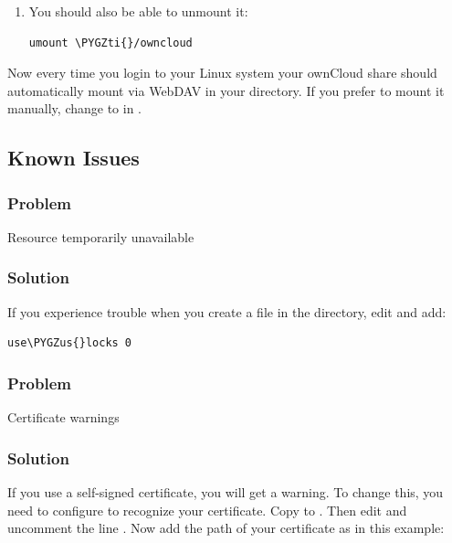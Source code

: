 \documentclass[letterpaper,10pt,english]{sphinxmanual}
\def\PYGZus{\char`\_}
\def\PYGZti{\char`\~}
\begin{document}
\begin{enumerate}
\begin{Verbatim}[commandchars=\\\{\}]
mount \PYGZti{}/owncloud
\end{Verbatim}

\item {} 
You should also be able to unmount it:

\begin{Verbatim}[commandchars=\\\{\}]
umount \PYGZti{}/owncloud
\end{Verbatim}

\end{enumerate}

Now every time you login to your Linux system your ownCloud share should
automatically mount via WebDAV in your  directory. If you prefer
to mount it manually, change  to  in .


\subsection{Known Issues}
\label{files/access_webdav:known-issues}

\subsubsection{Problem}
\label{files/access_webdav:problem}
Resource temporarily unavailable


\subsubsection{Solution}
\label{files/access_webdav:solution}
If you experience trouble when you create a file in the directory,
edit  and add:

\begin{Verbatim}[commandchars=\\\{\}]
use\PYGZus{}locks 0
\end{Verbatim}


\subsubsection{Problem}
\label{files/access_webdav:id1}
Certificate warnings


\subsubsection{Solution}
\label{files/access_webdav:id2}
If you use a self-signed certificate, you will get a warning. To
change this, you need to configure  to recognize your certificate.
Copy  to . Then edit
 and uncomment the line . Now add the
path of your certificate as in this example:
\end{document}
